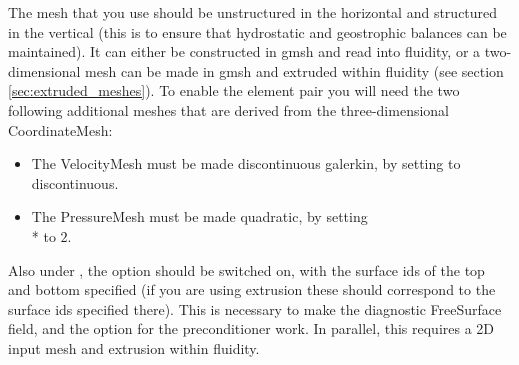 The mesh that you use should be unstructured in the horizontal and structured
in the vertical (this is to ensure that hydrostatic and geostrophic balances can
be maintained). It can either be constructed in gmsh and read into fluidity, or
a two-dimensional mesh can be made in gmsh and extruded within fluidity (see
section \ref{sec:extruded_meshes}). To enable the \PoDGPt element pair you will need
the two following additional meshes that are derived from the three-dimensional
CoordinateMesh:
\begin{itemize}
\item The VelocityMesh must be made discontinuous galerkin, by setting
   to discontinuous.  
\item The PressureMesh must be made quadratic, by setting
\\*   to $2$.  
\end{itemize}
Also under , the  option
should be switched on, with the surface ids of the top and bottom specified (if
you are using extrusion these should correspond to the surface ids specified
there). This is necessary to make the diagnostic FreeSurface field, and the
 option for the  preconditioner work. In
parallel, this requires a 2D input mesh and extrusion within fluidity.

